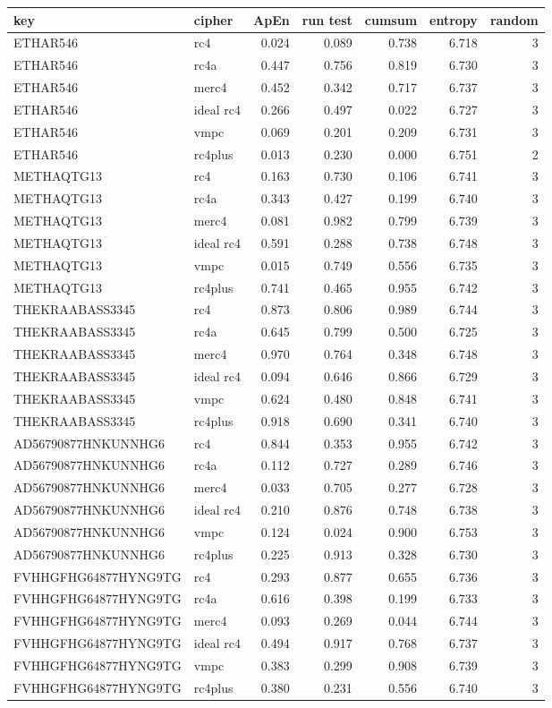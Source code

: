 \begin{tabular}{llrrrrr}
\toprule
key & cipher & ApEn & run test & cumsum & entropy & random \\
\midrule
ETHAR546 & rc4 & 0.024 & 0.089 & 0.738 & 6.718 & 3 \\
ETHAR546 & rc4a & 0.447 & 0.756 & 0.819 & 6.730 & 3 \\
ETHAR546 & merc4 & 0.452 & 0.342 & 0.717 & 6.737 & 3 \\
ETHAR546 & ideal rc4 & 0.266 & 0.497 & 0.022 & 6.727 & 3 \\
ETHAR546 & vmpc & 0.069 & 0.201 & 0.209 & 6.731 & 3 \\
ETHAR546 & rc4plus & 0.013 & 0.230 & 0.000 & 6.751 & 2 \\
METHAQTG13 & rc4 & 0.163 & 0.730 & 0.106 & 6.741 & 3 \\
METHAQTG13 & rc4a & 0.343 & 0.427 & 0.199 & 6.740 & 3 \\
METHAQTG13 & merc4 & 0.081 & 0.982 & 0.799 & 6.739 & 3 \\
METHAQTG13 & ideal rc4 & 0.591 & 0.288 & 0.738 & 6.748 & 3 \\
METHAQTG13 & vmpc & 0.015 & 0.749 & 0.556 & 6.735 & 3 \\
METHAQTG13 & rc4plus & 0.741 & 0.465 & 0.955 & 6.742 & 3 \\
THEKRAABASS3345 & rc4 & 0.873 & 0.806 & 0.989 & 6.744 & 3 \\
THEKRAABASS3345 & rc4a & 0.645 & 0.799 & 0.500 & 6.725 & 3 \\
THEKRAABASS3345 & merc4 & 0.970 & 0.764 & 0.348 & 6.748 & 3 \\
THEKRAABASS3345 & ideal rc4 & 0.094 & 0.646 & 0.866 & 6.729 & 3 \\
THEKRAABASS3345 & vmpc & 0.624 & 0.480 & 0.848 & 6.741 & 3 \\
THEKRAABASS3345 & rc4plus & 0.918 & 0.690 & 0.341 & 6.740 & 3 \\
AD56790877HNKUNNHG6 & rc4 & 0.844 & 0.353 & 0.955 & 6.742 & 3 \\
AD56790877HNKUNNHG6 & rc4a & 0.112 & 0.727 & 0.289 & 6.746 & 3 \\
AD56790877HNKUNNHG6 & merc4 & 0.033 & 0.705 & 0.277 & 6.728 & 3 \\
AD56790877HNKUNNHG6 & ideal rc4 & 0.210 & 0.876 & 0.748 & 6.738 & 3 \\
AD56790877HNKUNNHG6 & vmpc & 0.124 & 0.024 & 0.900 & 6.753 & 3 \\
AD56790877HNKUNNHG6 & rc4plus & 0.225 & 0.913 & 0.328 & 6.730 & 3 \\
FVHHGFHG64877HYNG9TG & rc4 & 0.293 & 0.877 & 0.655 & 6.736 & 3 \\
FVHHGFHG64877HYNG9TG & rc4a & 0.616 & 0.398 & 0.199 & 6.733 & 3 \\
FVHHGFHG64877HYNG9TG & merc4 & 0.093 & 0.269 & 0.044 & 6.744 & 3 \\
FVHHGFHG64877HYNG9TG & ideal rc4 & 0.494 & 0.917 & 0.768 & 6.737 & 3 \\
FVHHGFHG64877HYNG9TG & vmpc & 0.383 & 0.299 & 0.908 & 6.739 & 3 \\
FVHHGFHG64877HYNG9TG & rc4plus & 0.380 & 0.231 & 0.556 & 6.740 & 3 \\
\bottomrule
\end{tabular}
